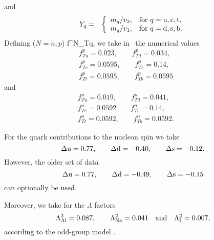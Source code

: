 and
\begin{eqnarray}
   Y_q & = & \left\{ \begin{array}{ll}
   m_q / v_2 , & {\rm for\ } q={\rm u,c,t}, \\
   m_q / v_1 , & {\rm for\ } q={\rm d,s,b}.
   \end{array} \right.
\end{eqnarray}
Defining ($N=n,p$)
\beq
f^N_{Tq},
\eeq
we take in \ds\ the numerical values \cite{Gasser}
\begin{eqnarray}
   & f^p_{Tu} = 0.023, \qquad f^p_{Td} = 0.034, \qquad
    &\nonumber\\
&f^p_{Tc} = 0.0595, \qquad f^p_{Ts} = 0.14, \qquad&\nonumber\\
&f^p_{Tt} = 0.0595, \qquad f^p_{Tb}=0.0595 \qquad
\end{eqnarray}
and
\begin{eqnarray}
   & f^n_{Tu} = 0.019, \qquad f^n_{Td} = 0.041, \qquad
    &\nonumber\\
&f^n_{Tc} = 0.0592 \qquad f^n_{Ts} = 0.14, \qquad&\nonumber\\
&f^n_{Tt} = 0.0592, \qquad f^n_{Tb} = 0.0592. \qquad
\end{eqnarray}

For the quark contributions to the nucleon spin we
take \cite{SMC}
\begin{equation}
   \Delta {\rm u} = 0.77, \qquad \Delta {\rm d} = -0.40, \qquad
   \Delta {\rm s} = -0.12 .
\end{equation}
However, the older set of data \cite{jaffe}
\begin{equation}
   \Delta {\rm u} = 0.77, \qquad \Delta {\rm d} = -0.49, \qquad
   \Delta {\rm s} = -0.15
\end{equation}
can optionally be used.

Moreover, we take for the $\Lambda$ factors
\begin{equation}
   \Lambda^2_{\rm Al} = 0.087, \qquad
   \Lambda^2_{\rm Na} = 0.041 \quad {\rm and} \quad
   \Lambda^2_{\rm I} = 0.007,
   \label{detrate2}
\end{equation}
according to the odd-group model \cite{EngelVogel}.


